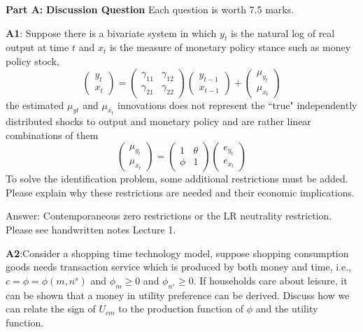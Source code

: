 \noindent \textbf{Part A:} \textbf{Discussion Question } Each question is
worth 7.5 marks.



\textbf{A1}:  Suppose there is a bivariate system in which $y_{t}$ is the
natural log of real output at time $t$ and $x_{t}$ is the measure of
monetary policy stance such as money policy stock,
\begin{equation}
\left(
\begin{array}{c}
y_{t} \\
x_{t}%
\end{array}%
\right) =\left(
\begin{array}{cc}
\gamma _{11} & \gamma _{12} \\
\gamma _{21} & \gamma _{22}%
\end{array}%
\right) \left(
\begin{array}{c}
y_{t-1} \\
x_{t-1}%
\end{array}%
\right) +\left(
\begin{array}{c}
\mu _{y_{t}} \\
\mu _{x_{t}}%
\end{array}%
\right)
\end{equation}%
the estimated $\mu _{yt}$ and $\mu _{x_{t}}$ innovations does not represent
the \textquotedblleft true" independently distributed shocks to output and
monetary policy and are rather linear combinations of them
\begin{equation}
\left(
\begin{array}{c}
\mu _{y_{t}} \\
\mu _{x_{t}}%
\end{array}%
\right) =\left(
\begin{array}{cc}
1 & \theta  \\
\phi  & 1%
\end{array}%
\right) \left(
\begin{array}{c}
e_{y_{t}} \\
e_{x_{t}}%
\end{array}%
\right)
\end{equation}%
To solve the identification problem, some additional restrictions must be
added. Please explain why these restrictions are needed and their economic
implications.


Answer: Contemporaneous zero restrictions or the LR neutrality restriction. Please see handwritten notes Lecture 1.

\vspace{0.5cm}
\textbf{A2}:Consider a shopping time technology model, suppose shopping
consumption goods needs transaction service which is produced by both money
and time, i.e., $c=\phi =\phi (m,n^{s})$ and $\phi _{m}\geq 0$ and $\phi
_{n^{s}}\geq 0$. If households care about leisure, it can be shown that a
money in utility preference can be derived. Discuss how we can  relate the sign of $U_{cm}$
to the production function of $\phi $ and the utility function.

